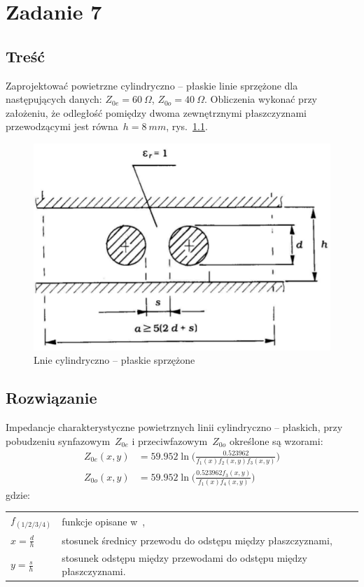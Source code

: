 \documentclass[rep.tex]{subfiles}
\begin{document}
\chapter{Zadanie 7}
\label{zad7}
\section{Treść}
Zaprojektować powietrzne cylindryczno -- płaskie linie sprzężone dla następujących danych:
$Z_{0e} = 60~\Omega$, $Z_{0o} = 40~\Omega$.
Obliczenia wykonać przy założeniu,
że odległość pomiędzy dwoma zewnętrznymi płaszczyznami przewodzącymi jest równa~$h = 8~mm$, rys.~\ref{fig:zad7:cf}.

\begin{figure}[!htbp]
  \centering
  \includegraphics[scale=0.5]{fig/zad7/cf}
  \caption{Lnie cylindryczno -- płaskie sprzężone}
  \label{fig:zad7:cf}
\end{figure}

\section{Rozwiązanie}
Impedancje charakterystyczne powietrznych linii cylindryczno -- płaskich,
przy pobudzeniu synfazowym~$Z_{0e}$ i przeciwfazowym~$Z_{0o}$ określone są wzorami:
\begin{align}
  Z_{0e}(x, y) &= 59.952 \ln \Bigg( \frac{0.523962}{f_1(x) f_2(x, y) f_3(x, y)} \Bigg) \\
  Z_{0o}(x, y) &= 59.952 \ln \Bigg( \frac{0.523962 f_3(x, y)}{f_1(x) f_4(x, y)} \Bigg)
\end{align}
gdzie:\\
\begin{tabular}{l @{ - } l}
  $f_{(1/2/3/4)}$ & funkcje opisane w~\cite{obwody}, \\
  $x = \frac{d}{h}$ & stosunek średnicy przewodu do odstępu między płaszczyznami, \\
  $y = \frac{s}{h}$ & stosunek odstępu między przewodami do odstępu między płaszczyznami. \\
\end{tabular}
\end{document}
